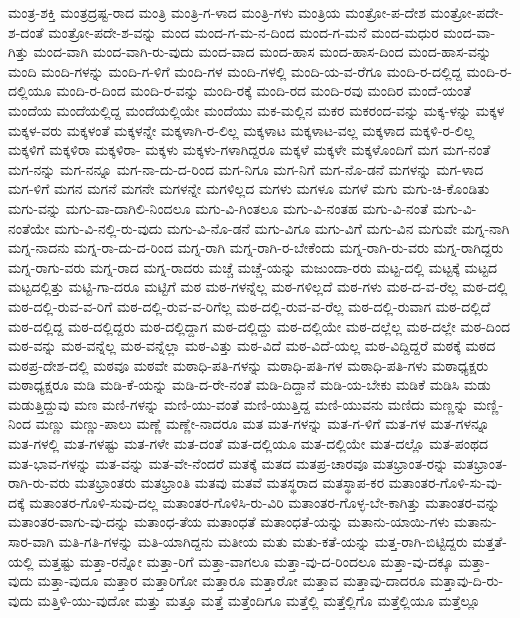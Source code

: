 {ಮಂತ್ರ-ಶಕ್ತಿ
ಮಂತ್ರದ್ರಷ್ಟ-ರಾದ
ಮಂತ್ರಿ
ಮಂತ್ರಿ-ಗ-ಳಾದ
ಮಂತ್ರಿ-ಗಳು
ಮಂತ್ರಿಯ
ಮಂತ್ರೋ-ಪ-ದೇಶ
ಮಂತ್ರೋ-ಪದೇ-ಶ-ದಂತೆ
ಮಂತ್ರೋ-ಪದೇ-ಶ-ವನ್ನು
ಮಂದ
ಮಂದ-ಗ-ಮ-ನ-ದಿಂದ
ಮಂದ-ಗ-ಮನೆ
ಮಂದ-ಮಧುರ
ಮಂದ-ವಾ-ಗಿತ್ತು
ಮಂದ-ವಾಗಿ
ಮಂದ-ವಾಗಿ-ರು-ವುದು
ಮಂದ-ವಾದ
ಮಂದ-ಹಾಸ
ಮಂದ-ಹಾಸ-ದಿಂದ
ಮಂದ-ಹಾಸ-ವನ್ನು
ಮಂದಿ
ಮಂದಿ-ಗಳನ್ನು
ಮಂದಿ-ಗ-ಳಿಗೆ
ಮಂದಿ-ಗಳ
ಮಂದಿ-ಗಳಲ್ಲಿ
ಮಂದಿ-ಯ-ವ-ರೆಗೂ
ಮಂದಿ-ರ-ದಲ್ಲಿದ್ದ
ಮಂದಿ-ರ-ದಲ್ಲಿಯೂ
ಮಂದಿ-ರ-ದಿಂದ
ಮಂದಿ-ರ-ವನ್ನು
ಮಂದಿ-ರಕ್ಕೆ
ಮಂದಿ-ರದ
ಮಂದಿ-ರವು
ಮಂದಿರ
ಮಂದೆ-ಯಂತೆ
ಮಂದೆಯ
ಮಂದೆಯಲ್ಲಿದ್ದ
ಮಂದೆಯಲ್ಲಿಯೇ
ಮಂದೆಯು
ಮಕ-ಮಲ್ಲಿನ
ಮಕರ
ಮಕರಂದ-ವನ್ನು
ಮಕ್ಕ-ಳನ್ನು
ಮಕ್ಕಳ
ಮಕ್ಕಳ-ವರು
ಮಕ್ಕಳಂತೆ
ಮಕ್ಕಳನ್ನೇ
ಮಕ್ಕಳಾಗಿ-ರ-ಲಿಲ್ಲ
ಮಕ್ಕಳಾಟ
ಮಕ್ಕಳಾಟ-ವಲ್ಲ
ಮಕ್ಕಳಾದ
ಮಕ್ಕಳಿ-ರ-ಲಿಲ್ಲ
ಮಕ್ಕಳಿಗೆ
ಮಕ್ಕಳಿರಾ
ಮಕ್ಕಳಿರಾ-
ಮಕ್ಕಳು
ಮಕ್ಕಳು-ಗಳಾಗಿದ್ದರೂ
ಮಕ್ಕಳೆ
ಮಕ್ಕಳೇ
ಮಕ್ಕಳೊಂದಿಗೆ
ಮಗ
ಮಗ-ನಂತೆ
ಮಗ-ನನ್ನು
ಮಗ-ನನ್ನೂ
ಮಗ-ನಾ-ದು-ದ-ರಿಂದ
ಮಗ-ನಿಗೂ
ಮಗ-ನಿಗೆ
ಮಗ-ನೊ-ಡನೆ
ಮಗಳನ್ನು
ಮಗ-ಳಾದ
ಮಗ-ಳಿಗೆ
ಮಗನ
ಮಗನೆ
ಮಗನೇ
ಮಗಳನ್ನೇ
ಮಗಳಿಲ್ಲದ
ಮಗಳು
ಮಗಳೂ
ಮಗಳೆ
ಮಗು
ಮಗು-ಚಿ-ಕೊಂಡಿತು
ಮಗು-ವನ್ನು
ಮಗು-ವಾ-ದಾಗಿಲಿ-ನಿಂದಲೂ
ಮಗು-ವಿ-ಗಿಂತಲೂ
ಮಗು-ವಿ-ನಂತಹ
ಮಗು-ವಿ-ನಂತೆ
ಮಗು-ವಿ-ನಂತೆಯೇ
ಮಗು-ವಿ-ನಲ್ಲಿ-ರು-ವುದು
ಮಗು-ವಿ-ನೊ-ಡನೆ
ಮಗು-ವಿಗೂ
ಮಗು-ವಿಗೆ
ಮಗು-ವಿನ
ಮಗುವೇ
ಮಗ್ನ-ನಾಗಿ
ಮಗ್ನ-ನಾದನು
ಮಗ್ನ-ರಾ-ದು-ದ-ರಿಂದ
ಮಗ್ನ-ರಾಗಿ
ಮಗ್ನ-ರಾಗಿ-ರ-ಬೇಕೆಂದು
ಮಗ್ನ-ರಾಗಿ-ರು-ವರು
ಮಗ್ನ-ರಾಗಿದ್ದರು
ಮಗ್ನ-ರಾಗು-ವರು
ಮಗ್ನ-ರಾದ
ಮಗ್ನ-ರಾದರು
ಮಚ್ಚೆ
ಮಚ್ಚೆ-ಯನ್ನು
ಮಜುಂದಾ-ರರು
ಮಟ್ಟ-ದಲ್ಲಿ
ಮಟ್ಟಕ್ಕೆ
ಮಟ್ಟದ
ಮಟ್ಟದಲ್ಲಿತ್ತು
ಮಟ್ಟಿ-ಗಾ-ದರೂ
ಮಟ್ಟಿಗೆ
ಮಠ
ಮಠ-ಗಳನ್ನೆಲ್ಲ
ಮಠ-ಗಳಿಲ್ಲದೆ
ಮಠ-ಗಳು
ಮಠ-ದ-ವ-ರೆಲ್ಲ
ಮಠ-ದಲ್ಲಿ
ಮಠ-ದಲ್ಲಿ-ರುವ-ವ-ರಿಗೆ
ಮಠ-ದಲ್ಲಿ-ರುವ-ವ-ರಿಗೆಲ್ಲ
ಮಠ-ದಲ್ಲಿ-ರುವ-ವ-ರೆಲ್ಲ
ಮಠ-ದಲ್ಲಿ-ರುವಾಗ
ಮಠ-ದಲ್ಲಿದೆ
ಮಠ-ದಲ್ಲಿದ್ದ
ಮಠ-ದಲ್ಲಿದ್ದರು
ಮಠ-ದಲ್ಲಿದ್ದಾಗ
ಮಠ-ದಲ್ಲಿದ್ದು
ಮಠ-ದಲ್ಲಿಯೇ
ಮಠ-ದಲ್ಲೆಲ್ಲ
ಮಠ-ದಲ್ಲೇ
ಮಠ-ದಿಂದ
ಮಠ-ವನ್ನು
ಮಠ-ವನ್ನೆಲ್ಲ
ಮಠ-ವನ್ನೆಲ್ಲಾ
ಮಠ-ವಿತ್ತು
ಮಠ-ವಿದೆ
ಮಠ-ವಿದೆ-ಯಲ್ಲ
ಮಠ-ವಿದ್ದಿದ್ದರೆ
ಮಠಕ್ಕೆ
ಮಠದ
ಮಠಪ್ರ-ದೇಶ-ದಲ್ಲಿ
ಮಠವೂ
ಮಠವೇ
ಮಠಾಧಿ-ಪತಿ-ಗಳನ್ನು
ಮಠಾಧಿ-ಪತಿ-ಗಳ
ಮಠಾಧಿ-ಪತಿ-ಗಳು
ಮಠಾಧ್ಯಕ್ಷರು
ಮಠಾಧ್ಯಕ್ಷರೂ
ಮಡಿ
ಮಡಿ-ಕೆ-ಯನ್ನು
ಮಡಿ-ದ-ರೇ-ನಂತೆ
ಮಡಿ-ದಿದ್ದಾನೆ
ಮಡಿ-ಯ-ಬೇಕು
ಮಡಿಕೆ
ಮಡಿಸಿ
ಮಡು
ಮಡುತ್ತಿದ್ದುವು
ಮಣ
ಮಣಿ-ಗಳನ್ನು
ಮಣಿ-ಯು-ವಂತೆ
ಮಣಿ-ಯುತ್ತಿದ್ದ
ಮಣಿ-ಯುವನು
ಮಣಿದು
ಮಣ್ಣನ್ನು
ಮಣ್ಣಿ-ನಿಂದ
ಮಣ್ಣು
ಮಣ್ಣು-ಪಾಲು
ಮಣ್ಣೆ
ಮಣ್ಣೇ-ನಾದರೂ
ಮತ
ಮತ-ಗಳನ್ನು
ಮತ-ಗ-ಳಿಗೆ
ಮತ-ಗಳ
ಮತ-ಗಳನ್ನೂ
ಮತ-ಗಳಲ್ಲಿ
ಮತ-ಗಳಷ್ಟು
ಮತ-ಗಳೇ
ಮತ-ದಂತೆ
ಮತ-ದಲ್ಲಿಯೂ
ಮತ-ದಲ್ಲಿಯೇ
ಮತ-ದಲ್ಲೊ
ಮತ-ಪಂಥದ
ಮತ-ಭಾವ-ಗಳನ್ನು
ಮತ-ವನ್ನು
ಮತ-ವೇ-ನೆಂದರೆ
ಮತಕ್ಕೆ
ಮತದ
ಮತಪ್ರ-ಚಾರವೂ
ಮತಭ್ರಾಂತ-ರನ್ನು
ಮತಭ್ರಾಂತ-ರಾಗಿ-ರು-ವರು
ಮತಭ್ರಾಂತರು
ಮತಭ್ರಾಂತಿ
ಮತವು
ಮತವೆ
ಮತಸ್ಥರಾದ
ಮತಸ್ಥಾಪ-ಕರ
ಮತಾಂತರ-ಗೊಳಿ-ಸು-ವು-ದಕ್ಕೆ
ಮತಾಂತರ-ಗೊಳಿ-ಸುವು-ದಲ್ಲ
ಮತಾಂತರ-ಗೊಳಿಸಿ-ರು-ವಿರಿ
ಮತಾಂತರ-ಗೊಳ್ಳ-ಬೇ-ಕಾಗಿತ್ತು
ಮತಾಂತರ-ವನ್ನು
ಮತಾಂತರ-ವಾಗು-ವು-ದನ್ನು
ಮತಾಂಧ-ತೆಯ
ಮತಾಂಧತೆ
ಮತಾಂಧತೆ-ಯನ್ನು
ಮತಾನು-ಯಾಯಿ-ಗಳು
ಮತಾನು-ಸಾರ-ವಾಗಿ
ಮತಿ-ಗತಿ-ಗಳನ್ನು
ಮತಿ-ಯಾಗಿದ್ದನು
ಮತೀಯ
ಮತು
ಮತು-ಕತೆ-ಯನ್ನು
ಮತ್ತ-ರಾಗಿ-ಬಿಟ್ಟಿದ್ದರು
ಮತ್ತತೆ-ಯಲ್ಲಿ
ಮತ್ತಷ್ಟು
ಮತ್ತಾ-ರನ್ನೋ
ಮತ್ತಾ-ರಿಗೆ
ಮತ್ತಾ-ವಾಗಲೂ
ಮತ್ತಾ-ವು-ದ-ರಿಂದಲೂ
ಮತ್ತಾ-ವು-ದಕ್ಕೂ
ಮತ್ತಾ-ವುದು
ಮತ್ತಾ-ವುದೂ
ಮತ್ತಾರ
ಮತ್ತಾರಿಗೋ
ಮತ್ತಾರೂ
ಮತ್ತಾರೋ
ಮತ್ತಾವ
ಮತ್ತಾವು-ದಾದರೂ
ಮತ್ತಾವು-ದಿ-ರು-ವುದು
ಮತ್ತಿಳಿ-ಯು-ವುದೋ
ಮತ್ತು
ಮತ್ತೂ
ಮತ್ತೆ
ಮತ್ತೆಂದಿಗೂ
ಮತ್ತೆಲ್ಲಿ
ಮತ್ತೆಲ್ಲಿಗೊ
ಮತ್ತೆಲ್ಲಿಯೂ
ಮತ್ತೆಲ್ಲೂ
}
